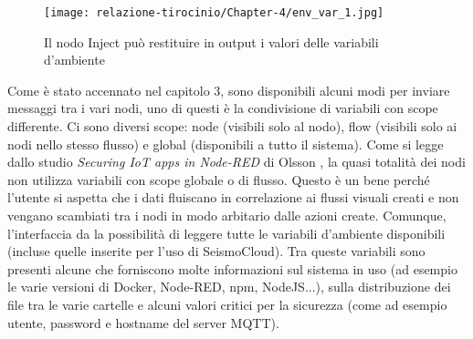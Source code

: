 \documentclass[a4paper,10pt]{memoir}
\begin{document}
\begin{figure}[ht]
    \texttt{[image: relazione-tirocinio/Chapter-4/env\_var\_1.jpg]}
    \caption{Il nodo Inject può restituire in output i valori delle variabili d'ambiente}
    \label{fig:env_var_1}
\end{figure}

Come è stato accennato nel capitolo 3, sono disponibili alcuni modi per inviare messaggi tra i vari nodi, uno di questi è la condivisione di variabili con scope differente.
Ci sono diversi scope: node (visibili solo al nodo), flow (visibili solo ai nodi nello stesso flusso) e global (disponibili a tutto il sistema).
Come si legge dallo studio \textit{Securing IoT apps in Node-RED} di Olsson \cite{securing}, la quasi totalità dei nodi non utilizza variabili con scope globale o di flusso. Questo è un bene perché l'utente si aspetta che i dati fluiscano in correlazione ai flussi visuali creati e non vengano scambiati tra i nodi in modo arbitario dalle azioni create.
Comunque, l'interfaccia da la possibilità di leggere tutte le variabili d'ambiente disponibili (incluse quelle inserite per l'uso di SeismoCloud).
Tra queste variabili sono presenti alcune che forniscono molte informazioni sul sistema in uso (ad esempio le varie versioni di Docker, Node-RED, npm, NodeJS...), sulla distribuzione dei file tra le varie cartelle e alcuni valori critici per la sicurezza (come ad esempio utente, password e hostname del server MQTT).
\end{document}
